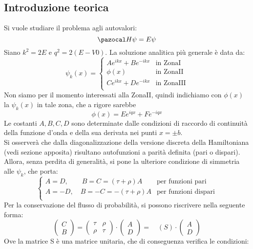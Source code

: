 \subsection*{Introduzione teorica}

Si vuole studiare il problema agli autovalori:
$$ \Hh\psi = E \psi $$
%
Siano $k^2 = 2E$ e  $q^2 = 2(E-V0)$. La soluzione analitica più generale è data da:
%
$$
\psi_k(x) =
    \begin{cases}
        Ae^{ikx}+Be^{-ikx} & \mbox{in ZonaI} \\
        \phi(x) & \mbox{in ZonaII} \\
        Ce^{ikx}+De^{-ikx} & \mbox{in ZonaIII} \\
    \end{cases}
$$
%
\bigskip
Non siamo per il momento interessati alla ZonaII, quindi indichiamo con
$\phi(x)$ la $\psi_k(x)$ in tale zona, che a rigore sarebbe
    $$\phi(x)= Ee^{iqx}+Fe^{-iqx}$$
Le costanti $A,B,C,D$ sono determinate dalle condizioni di raccordo di continuità della
funzione d'onda e della sua derivata nei punti $x=\pm b$.\\
Si osserverà che dalla diagonalizzazione della versione discreta della Hamiltoniana
(vedi sezione apposita) risultano autofunzioni a parità definita (pari o dispari).
Allora, senza perdita di generalità, si pone la ulteriore condizione di simmetria alle $\psi_k$, che porta:
$$\begin{cases}
    A = D, \qquad  B = C = (\tau + \rho)A &\mbox{per funzioni pari} \\
    A = -D, \quad B = -C = -(\tau + \rho)A &\mbox{per funzioni dispari}\\
\end{cases}$$
Per la conservazione del flusso di probabilità, si possono riscrivere nella seguente forma:
$$
    \begin{pmatrix} C \\ B \end{pmatrix} =
    \begin{pmatrix} \tau & \rho \\ \rho & \tau \end{pmatrix} \cdot
    \begin{pmatrix} A \\ D \end{pmatrix} = \quad (S)\cdot \begin{pmatrix} A \\ D \end{pmatrix}
$$
Ove la matrice S è una matrice unitaria, che di conseguenza verifica le condizioni:
